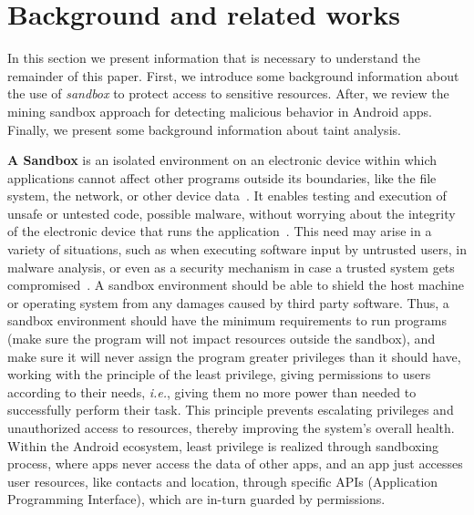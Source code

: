 \section{Background and related works}


In this section we present information that is necessary to understand the remainder of this paper.
First, we introduce some background information about the use of \emph{sandbox} to protect access
to sensitive resources. After, we review the mining sandbox approach for detecting malicious
behavior in Android apps. Finally, we present some background information about
taint analysis.

\textbf{A Sandbox} is an isolated environment on an electronic device within which applications cannot affect other programs outside its boundaries, like the file system, the network, or other device data~\cite{DBLP:journals/peerj-cs/MaassSCS16}. It enables testing and execution of unsafe or untested code, possible malware, without worrying about the integrity of the electronic device that runs the application~\cite{DBLP:conf/esorics/BordoniCS17}. This need may arise in a variety of situations, such as when executing software input by untrusted users, in malware analysis, or even as a security mechanism in case a trusted system gets compromised~\cite{DBLP:journals/peerj-cs/MaassSCS16}.
A sandbox environment should be able to shield the host machine or operating system from any damages caused by third party software. Thus, a sandbox environment should have the minimum requirements to run programs (make sure the program will not impact resources outside the sandbox), and make sure it will never assign the program greater privileges than it should have, 
working with the principle of the least privilege, giving permissions to users according to their needs, \textit{i.e.}, giving them no more power than needed to successfully perform their task. This principle prevents escalating privileges and unauthorized access to resources, thereby improving the system's overall health. Within the Android ecosystem, least privilege is realized through sandboxing process, where apps never access the data of other apps, and an app just accesses user resources, like contacts and location, through specific APIs (Application Programming Interface), which are in-turn guarded by permissions.

